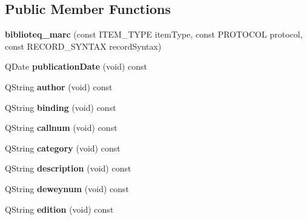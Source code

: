 \subsection*{Public Member Functions}
\begin{DoxyCompactItemize}
\item 
{\bfseries biblioteq\+\_\+marc} (const I\+T\+E\+M\+\_\+\+T\+Y\+PE item\+Type, const P\+R\+O\+T\+O\+C\+OL protocol, const R\+E\+C\+O\+R\+D\+\_\+\+S\+Y\+N\+T\+AX record\+Syntax)\hypertarget{classbiblioteq__marc_a9af2fe59b8c6715c7438a0f5c9e9d7b8}{}\label{classbiblioteq__marc_a9af2fe59b8c6715c7438a0f5c9e9d7b8}

\item 
Q\+Date {\bfseries publication\+Date} (void) const \hypertarget{classbiblioteq__marc_a5bc0e01eae71c6eb77b1d1516bf7ade9}{}\label{classbiblioteq__marc_a5bc0e01eae71c6eb77b1d1516bf7ade9}

\item 
Q\+String {\bfseries author} (void) const \hypertarget{classbiblioteq__marc_a513bbd4bf74fbcacf8cd6eabed82e556}{}\label{classbiblioteq__marc_a513bbd4bf74fbcacf8cd6eabed82e556}

\item 
Q\+String {\bfseries binding} (void) const \hypertarget{classbiblioteq__marc_a0bb5f29df73050b74ae5d853ebb7f373}{}\label{classbiblioteq__marc_a0bb5f29df73050b74ae5d853ebb7f373}

\item 
Q\+String {\bfseries callnum} (void) const \hypertarget{classbiblioteq__marc_a93b1be6807a22034a32581a33b4a178a}{}\label{classbiblioteq__marc_a93b1be6807a22034a32581a33b4a178a}

\item 
Q\+String {\bfseries category} (void) const \hypertarget{classbiblioteq__marc_aa04736480490504e95693a132946bf11}{}\label{classbiblioteq__marc_aa04736480490504e95693a132946bf11}

\item 
Q\+String {\bfseries description} (void) const \hypertarget{classbiblioteq__marc_a02d6d536aecd29b0e48d56c69c0d31d6}{}\label{classbiblioteq__marc_a02d6d536aecd29b0e48d56c69c0d31d6}

\item 
Q\+String {\bfseries deweynum} (void) const \hypertarget{classbiblioteq__marc_a2c8b68a507b7af55785d9d72e6f32fdd}{}\label{classbiblioteq__marc_a2c8b68a507b7af55785d9d72e6f32fdd}

\item 
Q\+String {\bfseries edition} (void) const \hypertarget{classbiblioteq__marc_aed042ffdaeb233582f955d93cc4ce05c}{}\label{classbiblioteq__marc_aed042ffdaeb233582f955d93cc4ce05c}


\end{DoxyCompactItemize}
